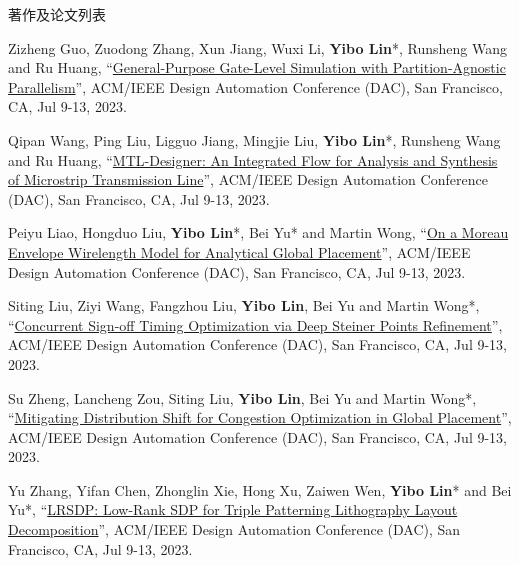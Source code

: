 \begin{rSection}{著作及论文列表}
\begin{description}[font=\normalfont, rightmargin=2em]
{}
            

\item[{[C122]}]{
        Zizheng Guo, Zuodong Zhang, Xun Jiang, Wuxi Li, \textbf{Yibo Lin}*, Runsheng Wang and Ru Huang, 
    ``\href{https://doi.org/10.1109/DAC56929.2023.10247907}{General-Purpose Gate-Level Simulation with Partition-Agnostic Parallelism}'', 
    ACM/IEEE Design Automation Conference (DAC), San Francisco, CA, Jul 9-13, 2023.
    
}
            

\item[{[C121]}]{
        Qipan Wang, Ping Liu, Ligguo Jiang, Mingjie Liu, \textbf{Yibo Lin}*, Runsheng Wang and Ru Huang, 
    ``\href{https://doi.org/10.1109/DAC56929.2023.10247759}{MTL-Designer: An Integrated Flow for Analysis and Synthesis of Microstrip Transmission Line}'', 
    ACM/IEEE Design Automation Conference (DAC), San Francisco, CA, Jul 9-13, 2023.
    
}
            

\item[{[C120]}]{
        Peiyu Liao, Hongduo Liu, \textbf{Yibo Lin}*, Bei Yu* and Martin Wong, 
    ``\href{https://doi.org/10.1109/DAC56929.2023.10247712}{On a Moreau Envelope Wirelength Model for Analytical Global Placement}'', 
    ACM/IEEE Design Automation Conference (DAC), San Francisco, CA, Jul 9-13, 2023.
    
}
            

\item[{[C119]}]{
        Siting Liu, Ziyi Wang, Fangzhou Liu, \textbf{Yibo Lin}, Bei Yu and Martin Wong*, 
    ``\href{https://doi.org/10.1109/DAC56929.2023.10247794}{Concurrent Sign-off Timing Optimization via Deep Steiner Points Refinement}'', 
    ACM/IEEE Design Automation Conference (DAC), San Francisco, CA, Jul 9-13, 2023.
    
}
            

\item[{[C118]}]{
        Su Zheng, Lancheng Zou, Siting Liu, \textbf{Yibo Lin}, Bei Yu and Martin Wong*, 
    ``\href{https://doi.org/10.1109/DAC56929.2023.10247660}{Mitigating Distribution Shift for Congestion Optimization in Global Placement}'', 
    ACM/IEEE Design Automation Conference (DAC), San Francisco, CA, Jul 9-13, 2023.
    
}
            

\item[{[C117]}]{
        Yu Zhang, Yifan Chen, Zhonglin Xie, Hong Xu, Zaiwen Wen, \textbf{Yibo Lin}* and Bei Yu*, 
    ``\href{https://doi.org/10.1109/DAC56929.2023.10247846}{LRSDP: Low-Rank SDP for Triple Patterning Lithography Layout Decomposition}'', 
    ACM/IEEE Design Automation Conference (DAC), San Francisco, CA, Jul 9-13, 2023.
    
}
\end{description}
\end{rSection}
